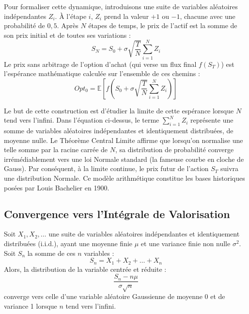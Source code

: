 \begin{examplebox}
Pour formaliser cette dynamique, introduisons une suite de variables aléatoires indépendantes $Z_i$. À l'étape $i$, $Z_i$ prend la valeur $+1$ ou $-1$, chacune avec une probabilité de $0,5$.
Après $N$ étapes de temps, le prix de l'actif est la somme de son prix initial et de toutes ses variations :
\begin{equation*}
    S_N = S_0 + \sigma \sqrt{\frac{T}{N}} \sum_{i=1}^{N} Z_i
\end{equation*}
Le prix sans arbitrage de l'option d'achat (qui verse un flux final $f(S_T)$) est l'espérance mathématique calculée sur l'ensemble de ces chemins :
\begin{equation*}
    Opt_0 = \mathbb{E}\left[ f\left( S_0 + \sigma \sqrt{\frac{T}{N}} \sum_{i=1}^{N} Z_i \right) \right]
\end{equation*}
\end{examplebox}

\begin{remarquebox}
Le but de cette construction est d'étudier la limite de cette espérance lorsque $N$ tend vers l'infini. 
Dans l'équation ci-dessus, le terme $\sum_{i=1}^{N} Z_i$ représente une somme de variables aléatoires indépendantes et identiquement distribuées, de moyenne nulle. Le Théorème Central Limite affirme que lorsqu'on normalise une telle somme par la racine carrée de $N$, sa distribution de probabilité converge irrémédiablement vers une loi Normale standard (la fameuse courbe en cloche de Gauss).
Par conséquent, à la limite continue, le prix futur de l'action $S_T$ suivra une distribution Normale. Ce modèle arithmétique constitue les bases historiques posées par Louis Bachelier en 1900.
\end{remarquebox}

\subsection{Convergence vers l'Intégrale de Valorisation}

\begin{theorembox}
Soit $X_1, X_2, \dots$ une suite de variables aléatoires indépendantes et identiquement distribuées (i.i.d.), ayant une moyenne finie $\mu$ et une variance finie non nulle $\sigma^2$.
Soit $S_n$ la somme de ces $n$ variables :
\begin{equation*}
    S_n = X_1 + X_2 + \dots + X_n
\end{equation*}
Alors, la distribution de la variable centrée et réduite :
\begin{equation*}
    \frac{S_n - n\mu}{\sigma \sqrt{n}}
\end{equation*}
converge vers celle d'une variable aléatoire Gaussienne de moyenne 0 et de variance 1 lorsque $n$ tend vers l'infini.
\end{theorembox}

